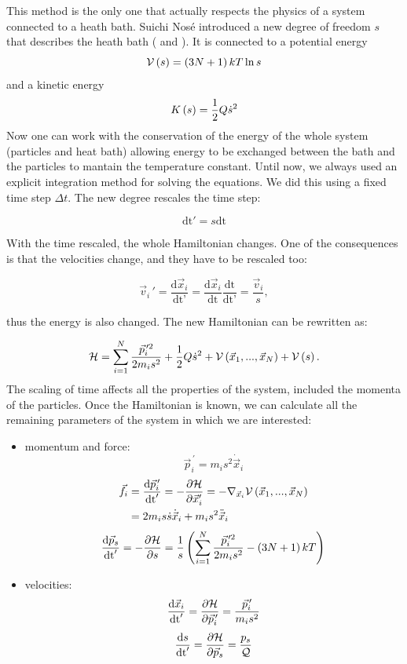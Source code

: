 This method is the only one that actually respects the physics of a system connected to a heath bath. Suichi Nos\'e introduced a new degree of freedom $s$ that describes the heath bath (\citet{nose} and \citet{nose2}). It is connected to a potential energy
\begin{equation}
\mathcal{V}\left(s\right) = \left(3N+1\right)kT\ln{s}
\end{equation}
and  a kinetic energy
\begin{equation}
K\left(s\right) = \frac{1}{2} Q \dot{s}^2
\end{equation}
Now one can work with the conservation of the energy of the whole system (particles and heat bath) allowing energy to be exchanged between the bath and the particles to mantain the temperature constant. Until now, we always used an explicit integration method for solving the equations. We did this using a fixed time step $\Delta t$. The new degree rescales the time step:

\begin{equation}
\text{dt}'=s\text{dt}
\end{equation}

With the time rescaled, the whole Hamiltonian changes. One of the consequences is that the velocities change, and they have to be rescaled too:

\begin{equation*}
\vec{v}_i\,' = \frac{\text{d}\vec{x}_i}{\text{dt'}} = \frac{\text{d}\vec{x}_i}{\text{dt}} \frac{\text{dt}}{\text{dt'}} = \frac{\vec{v}_i}{s},
\end{equation*}

thus the energy is also changed. The new Hamiltonian can be rewritten as:

\begin{equation}
\mathcal{H} = \sum^N_{i=1}{ \frac{\vec{p}^{\,\prime 2}_i}{2m_is^2} } + \frac{1}{2}Q \dot{s}^2 + \mathcal{V}\left(\vec{x}_1,...,\vec{x}_N\right) + \mathcal{V}\left(s\right).
\end{equation}
The scaling of time affects all the properties of the system, included the momenta of the particles. Once the Hamiltonian is known, we can calculate all the remaining parameters of the system in which we are interested:

\begin{itemize} 
\item momentum and force: 
$$\vec{p}_i^{\,\prime}= m_is^2\dot{\vec{x}}_i$$ 
\begin{align*}
\vec{f}_i &= \frac{\text{d}\vec{p}_i^{\,\prime}}{\text{dt}'} =-\frac{\partial \mathcal{H}}{\partial \vec{x}_i'}=-\nabla_{\vec{x}_i}\mathcal{V}\left(\vec{x}_1,...,\vec{x}_N\right) \\
&= 2m_i s \dot{s}\dot{\vec{x}}_i + m_is^2\ddot{\vec{x}}_i
\end{align*} 
$$\frac{\text{d}\vec{p}_s}{\text{dt}'} =-\frac{\partial \mathcal{H}}{\partial s} = \frac{1}{s}\left(    \sum^N_{i=1}{ \frac{\vec{p}_i^{\,\prime 2}}{2m_is^2} }  -  \left(3N+1\right)kT   \right) $$   
\item velocities:  
$$\frac{\text{d}\vec{x}_i}{\text{dt}'} = \frac{\partial \mathcal{H}}{\partial \vec{p}_i^{\,\prime}}=\frac{\vec{p}_i^{\,\prime}}{m_i s^2}$$ 
$$ \frac{\text{d}s}{\text{dt}'} = \frac{\partial \mathcal{H}}{\partial \vec{p}_s}=\frac{p_s}{\mathcal{Q}}   $$
\end{itemize}


